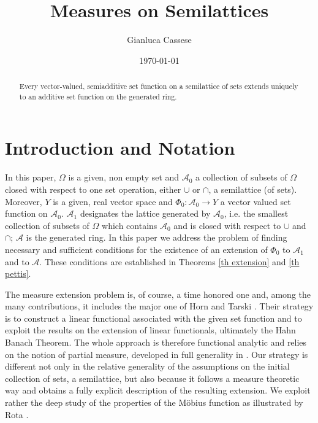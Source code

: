 \documentclass[11pt]{amsart}
\theoremstyle{plain}
\begin{document}
 
\title{Measures on Semilattices}
{\author{Gianluca Cassese}
                     \address{Universit\`{a} Milano Bicocca}
                     } \date \today {} 

\begin{abstract} 
Every vector-valued, semiadditive set function on a semilattice of sets extends uniquely 
to an additive set function on the generated ring. 
\end{abstract}

\maketitle

\section{Introduction and Notation} 
In this paper, $\Omega$ is a given, non empty set and ${\mathscr{A}}_0$ a collection of 
subsets of $\Omega$ closed with respect to one set operation, either $\cup$ or 
$\cap$, a semilattice (of sets). Moreover, $Y$ is a given, real vector space
and $\Phi_0:{\mathscr{A}}_0\to Y$ a vector valued set function on ${\mathscr{A}}_0$. ${\mathscr{A}}_1$ 
designates the lattice generated by ${\mathscr{A}}_0$, i.e. the smallest collection of subsets 
of $\Omega$ which contains ${\mathscr{A}}_0$ and is closed with respect to $\cup$ and 
$\cap$; ${\mathscr{A}}$ is the generated ring. In this paper we address the problem of
finding necessary and sufficient conditions for the existence of an extension
of $\Phi_0$ to ${\mathscr{A}}_1$ and to ${\mathscr{A}}$. These conditions are established in Theorems 
\ref{th extension} and \ref{th pettis}. 

The measure extension problem is, of course, a time honored one and, among 
the many contributions, it includes the major one of Horn and Tarski 
\cite[Theorem 1.21]{horn tarski}. Their strategy is to construct a linear functional 
associated with the given set function and to exploit the results on the extension of 
linear functionals, ultimately the Hahn Banach Theorem. The whole approach is 
therefore functional analytic and relies on the notion of partial  measure, developed 
in full generality in \cite[chapter 3]{rao}. Our strategy is different not only in the relative 
generality of the assumptions on the initial collection of sets, a semilattice, but also 
because it follows a measure theoretic way and obtains a fully explicit description of 
the resulting extension. We exploit rather the deep study of the properties of the 
M\"{o}bius function as illustrated by Rota \cite{rota}.
\end{document}
